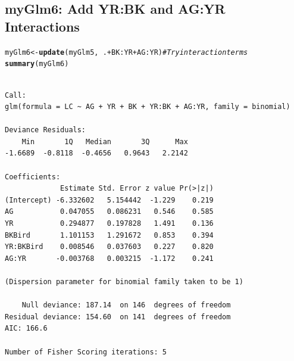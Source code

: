 \documentclass[oneside]{book}\usepackage[]{graphicx}\usepackage[svgnames]{xcolor}
\makeatletter
\newcommand{\hlcom}[1]{\textcolor[rgb]{0.678,0.584,0.686}{\textit{#1}}}%
\newcommand{\hlopt}[1]{\textcolor[rgb]{0,0,0}{#1}}%
\newcommand{\hlstd}[1]{\textcolor[rgb]{0.345,0.345,0.345}{#1}}%
\newcommand{\hlkwb}[1]{\textcolor[rgb]{0.69,0.353,0.396}{#1}}%
\newcommand{\hlkwd}[1]{\textcolor[rgb]{0.737,0.353,0.396}{\textbf{#1}}}%
\newenvironment{kframe}{%
 \def\at@end@of@kframe{}%
 \ifinner\ifhmode%
  \def\at@end@of@kframe{\end{minipage}}%
  \begin{minipage}{\columnwidth}%
 \fi\fi%
 \def\FrameCommand##1{\hskip\@totalleftmargin \hskip-\fboxsep
 \colorbox{shadecolor}{##1}\hskip-\fboxsep
     \hskip-\linewidth \hskip-\@totalleftmargin \hskip\columnwidth}%
 \MakeFramed {\advance\hsize-\width
   \@totalleftmargin\z@ \linewidth\hsize
   \@setminipage}}%
 {\par\unskip\endMakeFramed%
 \at@end@of@kframe}
\newenvironment{knitrout}{}{} %
\makeatother
\begin{document}
\subsection*{myGlm6: Add YR:BK and AG:YR Interactions}
\begin{knitrout}
\color{fgcolor}\begin{kframe}
\begin{alltt}
\hlstd{myGlm6} \hlkwb{<-} \hlkwd{update}\hlstd{(myGlm5,} \hlopt{~}\hlstd{.} \hlopt{+} \hlstd{BK}\hlopt{:}\hlstd{YR} \hlopt{+} \hlstd{AG}\hlopt{:}\hlstd{YR)}  \hlcom{# Try interaction terms}
\hlkwd{summary}\hlstd{(myGlm6)}
\end{alltt}
\begin{verbatim}

Call:
glm(formula = LC ~ AG + YR + BK + YR:BK + AG:YR, family = binomial)

Deviance Residuals: 
    Min       1Q   Median       3Q      Max  
-1.6689  -0.8118  -0.4656   0.9643   2.2142  

Coefficients:
             Estimate Std. Error z value Pr(>|z|)
(Intercept) -6.332602   5.154442  -1.229    0.219
AG           0.047055   0.086231   0.546    0.585
YR           0.294877   0.197828   1.491    0.136
BKBird       1.101153   1.291672   0.853    0.394
YR:BKBird    0.008546   0.037603   0.227    0.820
AG:YR       -0.003768   0.003215  -1.172    0.241

(Dispersion parameter for binomial family taken to be 1)

    Null deviance: 187.14  on 146  degrees of freedom
Residual deviance: 154.60  on 141  degrees of freedom
AIC: 166.6

Number of Fisher Scoring iterations: 5
\end{verbatim}
\end{kframe}
\end{knitrout}
\end{document}

